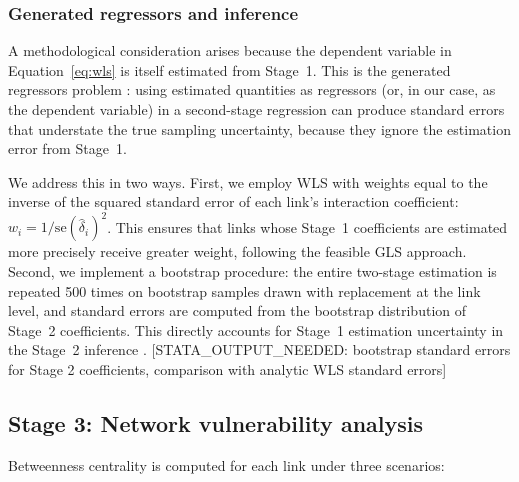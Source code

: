 \documentclass[review]{elsarticle}
\begin{document}
\subsubsection{Generated regressors and inference}

A methodological consideration arises because the dependent variable in Equation~\eqref{eq:wls} is itself estimated from Stage~1. This is the generated regressors problem \citep{pagan1984econometric}: using estimated quantities as regressors (or, in our case, as the dependent variable) in a second-stage regression can produce standard errors that understate the true sampling uncertainty, because they ignore the estimation error from Stage~1.

We address this in two ways. First, we employ WLS with weights equal to the inverse of the squared standard error of each link's interaction coefficient: $w_i = 1 / \text{se}(\hat{\delta}_i)^2$. This ensures that links whose Stage~1 coefficients are estimated more precisely receive greater weight, following the feasible GLS approach. Second, we implement a bootstrap procedure: the entire two-stage estimation is repeated 500 times on bootstrap samples drawn with replacement at the link level, and standard errors are computed from the bootstrap distribution of Stage~2 coefficients. This directly accounts for Stage~1 estimation uncertainty in the Stage~2 inference \citep{murphy1985estimation}. [STATA\_OUTPUT\_NEEDED: bootstrap standard errors for Stage 2 coefficients, comparison with analytic WLS standard errors]


\subsection{Stage 3: Network vulnerability analysis}
\label{sec:method:centrality}

Betweenness centrality \citep{freeman1977centrality} is computed for each link under three scenarios:

\end{document}
